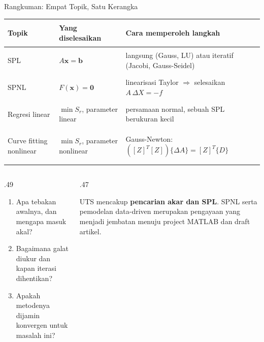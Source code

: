 \documentclass[aspectratio=169,10pt]{beamer}
\begin{document}
\begin{frame}{Rangkuman: Empat Topik, Satu Kerangka}
\scriptsize
\renewcommand{\arraystretch}{1.35}
\begin{tabularx}{\linewidth}{>{\bfseries\raggedright\arraybackslash}p{.15\linewidth} X X}
\toprule
Topik & Yang diselesaikan & Cara memperoleh langkah\\
\midrule
SPL & $A\mathbf{x}=\mathbf{b}$ & langsung (Gauss, LU) atau iteratif (Jacobi, Gauss-Seidel)\\
SPNL & $F(\mathbf{x})=\mathbf{0}$ & linearisasi Taylor $\Rightarrow$ selesaikan $A\,\Delta X=-f$\\
Regresi linear & $\min S_r$, parameter linear & persamaan normal, sebuah SPL berukuran kecil\\
Curve fitting nonlinear & $\min S_r$, parameter nonlinear & Gauss-Newton: $([Z]^T[Z])\{\Delta A\}=[Z]^T\{D\}$\\
\bottomrule
\end{tabularx}
\vspace{2mm}
\begin{columns}[T,totalwidth=\textwidth]
\begin{column}{.49\textwidth}
\begin{bluebox}
\begin{enumerate}\setlength\itemsep{2pt}
\item Apa tebakan awalnya, dan mengapa masuk akal?
\item Bagaimana galat diukur dan kapan iterasi dihentikan?
\item Apakah metodenya dijamin konvergen untuk masalah ini?
\end{enumerate}
\end{bluebox}
\end{column}
\begin{column}{.47\textwidth}
\begin{orangebox}
UTS mencakup \textbf{pencarian akar dan SPL}. SPNL serta pemodelan data-driven merupakan pengayaan yang menjadi jembatan menuju project MATLAB dan draft artikel.
\end{orangebox}
\end{column}
\end{columns}
\end{frame}
\end{document}
